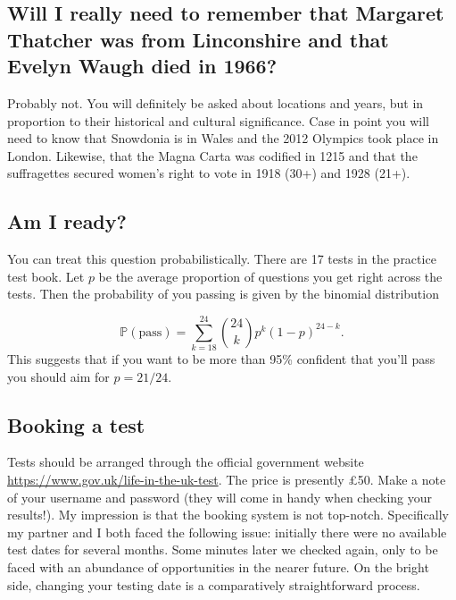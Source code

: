 \documentclass[10pt,reqno]{amsart}
\begin{document}
\subsection{Will I really need to remember that Margaret Thatcher was from Linconshire and that Evelyn Waugh died in 1966?} Probably not. You will definitely be asked about locations and years, but in proportion to their historical and cultural significance. Case in point you will need to know that Snowdonia is in Wales and the 2012 Olympics took place in London. Likewise, that the Magna Carta was codified in 1215 and that the suffragettes secured women's right to vote in 1918 (30+) and 1928 (21+).  


\subsection{Am I ready?} You can treat this question probabilistically. There are 17 tests in the practice test book. Let $p$ be the average proportion of questions you get right across the tests. Then the probability of you passing is given by the binomial distribution

\[
\mathbb{P}(\text{pass}) = \sum_{k=18}^{24} \binom{24}{k} p^k (1-p)^{24-k}.
\] 
This suggests that if you want to be more than 95\% confident that you'll pass you should aim for $p=21/24$. 

\subsection{Booking a test} Tests should be arranged through the official government website \url{https://www.gov.uk/life-in-the-uk-test}. The price is presently \pounds 50. Make a note of your username and password (they will come in handy when checking your results!). My impression is that the booking system is not top-notch. Specifically my partner and I both faced the following issue: initially there were no available test dates for several months. Some minutes later we checked again, only to be faced with an abundance of opportunities in the nearer future. On the bright side, changing your testing date is a comparatively straightforward process.  
\end{document}
